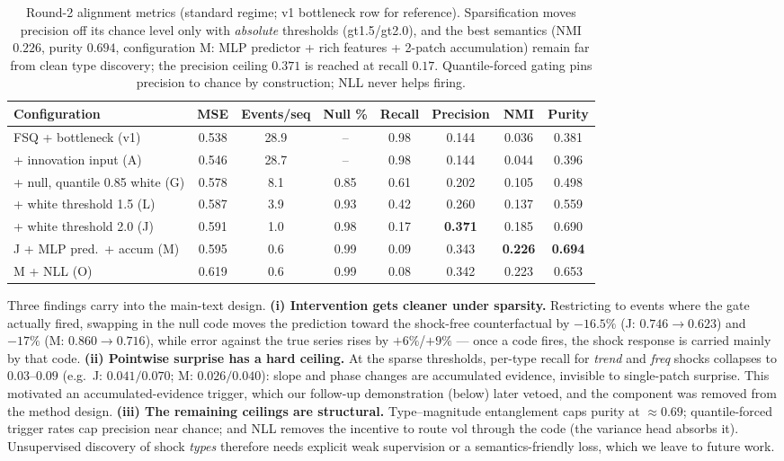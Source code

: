 \begin{table}[t]
\caption{Round-2 alignment metrics (standard regime; v1 bottleneck row for reference). Sparsification moves precision off its chance level only with \emph{absolute} thresholds (gt1.5/gt2.0), and the best semantics (NMI $0.226$, purity $0.694$, configuration M: MLP predictor + rich features + 2-patch accumulation) remain far from clean type discovery; the precision ceiling $0.371$ is reached at recall $0.17$. Quantile-forced gating pins precision to chance by construction; NLL never helps firing.}
\label{tab:action_v2}
\centering\small
\begin{tabular}{lccccccc}
\toprule
Configuration & MSE & Events/seq & Null \% & Recall & Precision & NMI & Purity \\
\midrule
FSQ + bottleneck (v1) & 0.538 & 28.9 & -- & 0.98 & 0.144 & 0.036 & 0.381 \\
\quad + innovation input (A) & 0.546 & 28.7 & -- & 0.98 & 0.144 & 0.044 & 0.396 \\
\quad + null, quantile 0.85 white (G) & 0.578 & 8.1 & 0.85 & 0.61 & 0.202 & 0.105 & 0.498 \\
\quad + white threshold 1.5 (L) & 0.587 & 3.9 & 0.93 & 0.42 & 0.260 & 0.137 & 0.559 \\
\quad + white threshold 2.0 (J) & 0.591 & 1.0 & 0.98 & 0.17 & \textbf{0.371} & 0.185 & 0.690 \\
\quad J + MLP pred.\ + accum (M) & 0.595 & 0.6 & 0.99 & 0.09 & 0.343 & \textbf{0.226} & \textbf{0.694} \\
\quad M + NLL (O) & 0.619 & 0.6 & 0.99 & 0.08 & 0.342 & 0.223 & 0.653 \\
\bottomrule
\end{tabular}
\end{table}

Three findings carry into the main-text design. \textbf{(i) Intervention gets cleaner under sparsity.} Restricting to events where the gate actually fired, swapping in the null code moves the prediction toward the shock-free counterfactual by $-16.5\%$ (J: $0.746 \to 0.623$) and $-17\%$ (M: $0.860 \to 0.716$), while error against the true series rises by $+6\%$/$+9\%$ --- once a code fires, the shock response is carried mainly by that code. \textbf{(ii) Pointwise surprise has a hard ceiling.} At the sparse thresholds, per-type recall for \emph{trend} and \emph{freq} shocks collapses to $0.03$--$0.09$ (e.g.\ J: $0.041/0.070$; M: $0.026/0.040$): slope and phase changes are accumulated evidence, invisible to single-patch surprise. This motivated an accumulated-evidence trigger, which our follow-up demonstration (below) later vetoed, and the component was removed from the method design. \textbf{(iii) The remaining ceilings are structural.} Type--magnitude entanglement caps purity at $\approx 0.69$; quantile-forced trigger rates cap precision near chance; and NLL removes the incentive to route vol through the code (the variance head absorbs it). Unsupervised discovery of shock \emph{types} therefore needs explicit weak supervision or a semantics-friendly loss, which we leave to future work.
